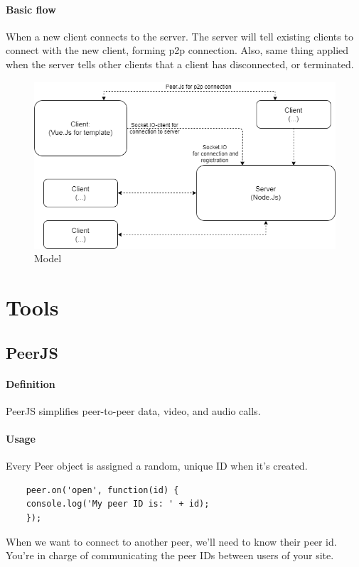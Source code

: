 \documentclass{article}
\begin{document}
\paragraph{Basic flow}
When a new client connects to the server. The server will tell existing clients to connect with the new client, forming p2p connection. Also, same thing applied when the server tells other clients that a client has disconnected, or terminated.
    \begin{figure}[H]
    \includegraphics[width=\linewidth]{Model.png}
    \caption{Model}
    \end{figure}

\section{Tools}
\subsection{PeerJS}
    \paragraph{Definition}    
    PeerJS simplifies peer-to-peer data, video, and audio calls.
    \paragraph{Usage}
    Every Peer object is assigned a random, unique ID when it's created.

    \begin{lstlisting}
    peer.on('open', function(id) {
    console.log('My peer ID is: ' + id);
    });
    \end{lstlisting}

     When we want to connect to another peer, we'll need to know their peer id. You're in charge of communicating the peer IDs between users of your site.
    
\end{document}
